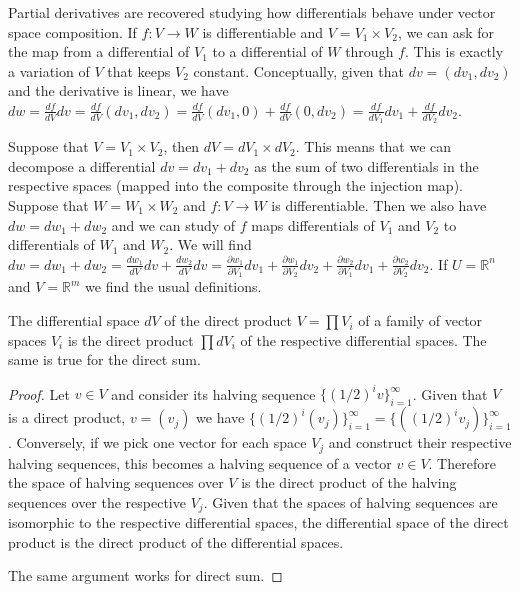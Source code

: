 \documentclass[11pt,letterpaper,fleqn]{memoir}
\begin{document}
Partial derivatives are recovered studying how differentials behave under vector space composition. If $f : V \to W$ is differentiable and $V = V_1 \times V_2$, we can ask for the map from a differential of $V_1$ to a differential of $W$ through $f$. This is exactly a variation of $V$ that keeps $V_2$ constant. Conceptually, given that $dv = (dv_1, dv_2)$ and the derivative is linear, we have $dw = \frac{df}{dV} dv = \frac{df}{dV} (dv_1, dv_2) = \frac{df}{dV} (dv_1, 0) + \frac{df}{dV} (0, dv_2) = \frac{df}{dV_1} dv_1 + \frac{df}{dV_2} dv_2$.
	
Suppose that $V = V_1 \times V_2$, then $dV = dV_1 \times dV_2$. This means that we can decompose a differential $dv= dv_1 + dv_2$ as the sum of two differentials in the respective spaces (mapped into the composite through the injection map). Suppose that $W = W_1 \times W_2$ and $f : V \to W$ is differentiable. Then we also have $dw= dw_1 + dw_2$ and we can study of $f$ maps differentials of $V_1$ and $V_2$ to differentials of $W_1$ and $W_2$. We will find $dw = dw_1 + dw_2 = \frac{dw_1}{dV} dv + \frac{dw_2}{dV} dv = \frac{\partial w_1}{\partial V_1} dv_1 + \frac{\partial w_1}{\partial V_2} dv_2 + \frac{\partial w_2}{\partial V_1} dv_1 + \frac{\partial w_2}{\partial V_2} dv_2$. If $U = \mathbb{R}^n$ and $V = \mathbb{R}^m$ we find the usual definitions.

\begin{prop}
	The differential space $dV$ of the direct product $V=\prod V_i$ of a family of vector spaces $V_i$ is the direct product $\prod dV_i$ of the respective differential spaces. The same is true for the direct sum.
\end{prop}

\begin{proof}
	Let $v \in V$ and consider its halving sequence $\{(1/2)^i v\}_{i=1}^{\infty}$. Given that $V$ is a direct product, $v=(v_j)$ we have $\{(1/2)^i (v_j)\}_{i=1}^{\infty} = \{((1/2)^i v_j)\}_{i=1}^{\infty}$. Conversely, if we pick one vector for each space $V_j$ and construct their respective halving sequences, this becomes a halving sequence of a vector $v \in V$. Therefore the space of halving sequences over $V$ is the direct product of the halving sequences over the respective $V_j$. Given that the spaces of halving sequences are isomorphic to the respective differential spaces, the differential space of the direct product is the direct product of the differential spaces.
	
	The same argument works for direct sum.
\end{proof}
\end{document}
